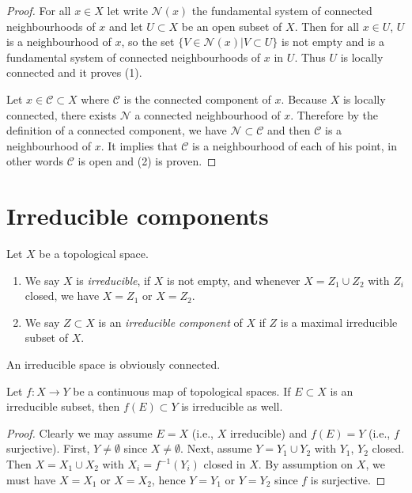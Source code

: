 \begin{proof}
For all $x\in X$ let write $\mathcal{N}(x)$ the fundamental system of connected
neighbourhoods of $x$ and let $U\subset X$ be an open subset of $X$. Then for
all $x\in U$, $U$ is a neighbourhood of $x$, so the set
$\{V \in \mathcal{N}(x) | V\subset U\}$
is not empty and is a fundamental system of connected
neighbourhoods of $x$ in $U$. Thus $U$ is locally connected and it proves (1).

\medskip\noindent
Let $x \in \mathcal{C} \subset X$ where $\mathcal{C}$ is the connected component
of $x$. Because $X$ is locally connected, there exists $\mathcal{N}$ a
connected neighbourhood of $x$. Therefore by the definition of a connected
component, we have $\mathcal{N} \subset \mathcal{C}$ and then $\mathcal{C}$ is
a neighbourhood of $x$. It implies that $\mathcal{C}$ is a neighbourhood of
each of his point, in other words $\mathcal{C}$ is open and (2) is proven.
\end{proof}




\section{Irreducible components}
\label{section-irreducible-components}

\begin{definition}
\label{definition-irreducible-components}
Let $X$ be a topological space.
\begin{enumerate}
\item We say $X$ is {\it irreducible}, if $X$ is not empty, and whenever
$X = Z_1 \cup Z_2$ with $Z_i$ closed, we have $X = Z_1$ or $X = Z_2$.
\item We say $Z \subset X$ is an {\it irreducible component} of $X$
if $Z$ is a maximal irreducible subset of $X$.
\end{enumerate}
\end{definition}

\noindent
An irreducible space is obviously connected.

\begin{lemma}
\label{lemma-image-irreducible-space}
Let $f : X \to Y$ be a continuous map of topological spaces.
If $E \subset X$ is an irreducible subset, then $f(E) \subset Y$
is irreducible as well.
\end{lemma}

\begin{proof}
Clearly we may assume $E = X$ (i.e., $X$ irreducible)
and $f(E) = Y$ (i.e., $f$ surjective). First, $Y \not = \emptyset$
since $X \not = \emptyset$. Next, assume $Y = Y_1 \cup Y_2$ with
$Y_1$, $Y_2$ closed. Then $X = X_1 \cup X_2$ with $X_i = f^{-1}(Y_i)$
closed in $X$. By assumption on $X$, we must have
$X = X_1$ or $X = X_2$, hence $Y = Y_1$ or $Y = Y_2$
since $f$ is surjective.
\end{proof}


